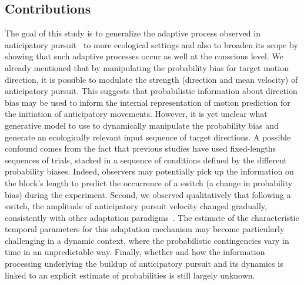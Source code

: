 \documentclass[10pt,letterpaper]{article}
\newcommand{\citep}[1]{\cite{#1}}
\begin{document}
\subsection{Contributions}%
The goal of this study is to generalize the adaptive process
observed in anticipatory pursuit~\citep{Montagnini2010,SantosKowler2017}
to more ecological settings and
also to broaden its scope by showing that such adaptive processes
occur as well at the conscious level.
We already mentioned that by manipulating the probability bias for target motion direction,
it is possible to modulate the strength (direction and mean velocity) of anticipatory pursuit.
This suggests that probabilistic information about direction bias may be used
to inform the internal representation of motion prediction
for the initiation of anticipatory movements.
However, it is yet unclear what generative model to use
to dynamically manipulate the probability bias
and generate an ecologically relevant input sequence of target directions.
A possible confound comes from the fact that
previous studies have used fixed-lengths sequences of trials, %
stacked in a sequence of conditions defined by the different probability biases.
Indeed, observers may potentially pick up
the information on the block's length
to predict the occurrence of a switch (a change in probability bias) during the experiment.
Second, we observed qualitatively that following a switch,
the amplitude of anticipatory pursuit velocity changed gradually,
consistently with other adaptation paradigms~\citep{Fukushima1996,Kahlon1996,Souto13}.
The estimate of the characteristic temporal parameters for this adaptation mechanism
may become particularly challenging in a dynamic context,
where the probabilistic contingencies vary in time in an unpredictable way.
Finally, whether and how the information processing underlying
the buildup of anticipatory pursuit and its dynamics is linked to
an explicit estimate of probabilities is still largely unknown.
\end{document}
